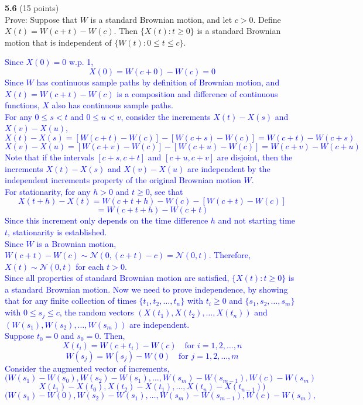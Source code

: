 \documentclass{article}
\begin{document}
\noindent
\textbf{5.6} (15 points) \\ Prove: Suppose that $W$ is a standard Brownian motion, and let $c > 0$. Define $X(t) = W(c + t) - W(c)$. Then $\{X(t) : t \ge 0\}$ is a standard Brownian motion that is independent of $\{W(t) : 0 \le t \le c\}$.

\textcolor{blue}{
    \noindent Since $X(0) = 0$ w.p. 1,
$$X(0)= W(c + 0) - W(c) = 0$$
\noindent 
Since $W$ has continuous sample paths by definition of Brownian motion, and $X(t) = W(c + t) - W(c)$ is a composition and difference of continuous functions, $X$ also has continuous sample paths. \\
\noindent For any $0 \leq s < t$ and $0 \leq u < v$, consider the increments $X(t) - X(s)$ and $X(v) - X(u)$, 
$$X(t) - X(s) = [W(c + t) - W(c)] - [W(c + s) - W(c)] = W(c + t) - W(c + s)$$
$$X(v) - X(u) = [W(c + v) - W(c)] - [W(c + u) - W(c)] = W(c + v) - W(c + u)$$
Note that if the intervals $[c+s, c+t]$ and $[c+u, c+v]$ are disjoint, then the increments $X(t) - X(s)$ and $X(v) - X(u)$ are independent by the independent increments property of the original Brownian motion $W$. \\
For stationarity, for any $h > 0$ and $t \geq 0$, see that 
$$X(t+h) - X(t) = W(c + t + h) - W(c) - [W(c + t) - W(c)]$$
$$= W(c + t + h) - W(c + t)$$
Since this increment only depends on the time difference $h$ and not starting time $t$, stationarity is established. \\
Since $W$ is a Brownian motion, $W(c + t) - W(c) \sim \mathcal{N}(0, (c+t) - c) = \mathcal{N}(0, t)$. Therefore, $X(t) \sim \mathcal{N}(0, t)$ for each $t > 0$. \\
Since all properties of standard Brownian motion are satisfied, $\{X(t) : t \geq 0\}$ is a standard Brownian motion.
\medskip
Now we need to prove independence, by showing that for any finite collection of times $\{t_1, t_2, \ldots, t_n\}$ with $t_i \geq 0$ and $\{s_1, s_2, \ldots, s_m\}$ with $0 \leq s_j \leq c$, the random vectors $(X(t_1), X(t_2), \ldots, X(t_n))$ and $(W(s_1), W(s_2), \ldots, W(s_m))$ are independent. \\
Suppose $t_0 = 0$ and $s_0 = 0$. Then,
$$X(t_i) = W(c + t_i) - W(c) \quad \text{for } i = 1, 2, \ldots, n$$
$$W(s_j) = W(s_j) - W(0) \quad \text{for } j = 1, 2, \ldots, m$$
Consider the augmented vector of increments,
$$(W(s_1) - W(s_0), W(s_2) - W(s_1), \ldots, W(s_m) - W(s_{m-1}), W(c) - W(s_m)$$
$$X(t_1) - X(t_0), X(t_2) - X(t_1), \ldots, X(t_n) - X(t_{n-1}))$$
$$(W(s_1) - W(0), W(s_2) - W(s_1), \ldots, W(s_m) - W(s_{m-1}), W(c) - W(s_m), $$
}
\end{document}
